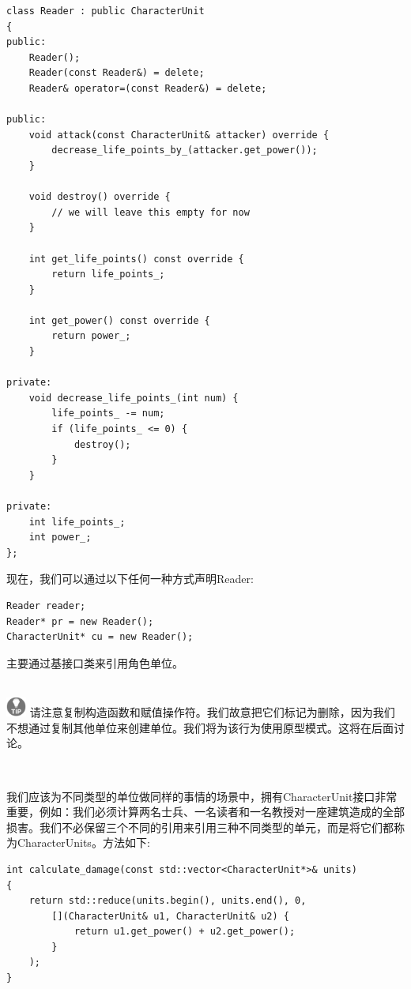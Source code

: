 \begin{lstlisting}[caption={}]
class Reader : public CharacterUnit
{
public:
	Reader();
	Reader(const Reader&) = delete;
	Reader& operator=(const Reader&) = delete;
	
public:
	void attack(const CharacterUnit& attacker) override {
		decrease_life_points_by_(attacker.get_power());
	}

	void destroy() override {
		// we will leave this empty for now
	}

	int get_life_points() const override {
		return life_points_;
	}

	int get_power() const override {
		return power_;
	}

private:
	void decrease_life_points_(int num) {
		life_points_ -= num;
		if (life_points_ <= 0) {
			destroy();
		}
	}

private:
	int life_points_;
	int power_;
};
\end{lstlisting}

现在，我们可以通过以下任何一种方式声明Reader: \par

\begin{lstlisting}[caption={}]
Reader reader;
Reader* pr = new Reader();
CharacterUnit* cu = new Reader();
\end{lstlisting}

主要通过基接口类来引用角色单位。 \par

\hspace*{\fill} \\ %
\includegraphics[width=0.05\textwidth]{images/tip}
请注意复制构造函数和赋值操作符。我们故意把它们标记为删除，因为我们不想通过复制其他单位来创建单位。我们将为该行为使用原型模式。这将在后面讨论。 \par
\noindent\textbf{}\ \par

我们应该为不同类型的单位做同样的事情的场景中，拥有CharacterUnit接口非常重要，例如：我们必须计算两名士兵、一名读者和一名教授对一座建筑造成的全部损害。我们不必保留三个不同的引用来引用三种不同类型的单元，而是将它们都称为CharacterUnits。方法如下: \par

\begin{lstlisting}[caption={}]
int calculate_damage(const std::vector<CharacterUnit*>& units)
{
	return std::reduce(units.begin(), units.end(), 0,
		[](CharacterUnit& u1, CharacterUnit& u2) {
			return u1.get_power() + u2.get_power();
		}
	);
}
\end{lstlisting}

